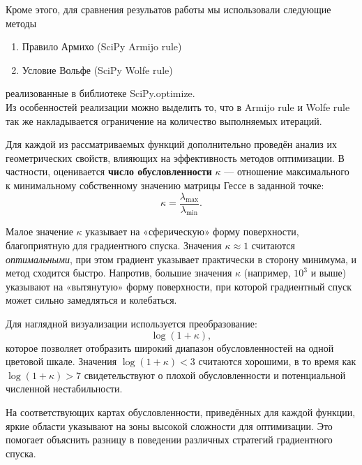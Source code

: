 \documentclass{article}
\begin{document}

Кроме этого, для сравнения резульатов работы мы использовали следующие методы

\begin{enumerate}
    \item Правило Армихо (SciPy Armijo rule)

    \item Условие Вольфе (SciPy Wolfe rule)
\end{enumerate}

реализованные в библиотеке SciPy.optimize.\\[2mm]


Из особенностей реализации можно выделить то, что в Armijo rule и Wolfe rule так же накладывается ограничение на количество выполняемых итераций.

\vspace{2mm}

Для каждой из рассматриваемых функций дополнительно проведён анализ их геометрических свойств, влияющих на эффективность методов оптимизации. В частности, оценивается \textbf{число обусловленности} $\kappa$ — отношение максимального к минимальному собственному значению матрицы Гессе в заданной точке:
\[
\kappa = \frac{\lambda_{\max}}{\lambda_{\min}}.
\]

Малое значение $\kappa$ указывает на «сферическую» форму поверхности, благоприятную для градиентного спуска. Значения $\kappa \approx 1$ считаются \textit{оптимальными}, при этом градиент указывает практически в сторону минимума, и метод сходится быстро. Напротив, большие значения $\kappa$ (например, $10^3$ и выше) указывают на «вытянутую» форму поверхности, при которой градиентный спуск может сильно замедляться и колебаться.

Для наглядной визуализации используется преобразование:
\[
\log(1 + \kappa),
\]
которое позволяет отобразить широкий диапазон обусловленностей на одной цветовой шкале. Значения $\log(1 + \kappa) < 3$ считаются хорошими, в то время как $\log(1 + \kappa) > 7$ свидетельствуют о плохой обусловленности и потенциальной численной нестабильности.

На соответствующих картах обусловленности, приведённых для каждой функции, яркие области указывают на зоны высокой сложности для оптимизации. Это помогает объяснить разницу в поведении различных стратегий градиентного спуска.

\vspace{3mm}
\end{document}

